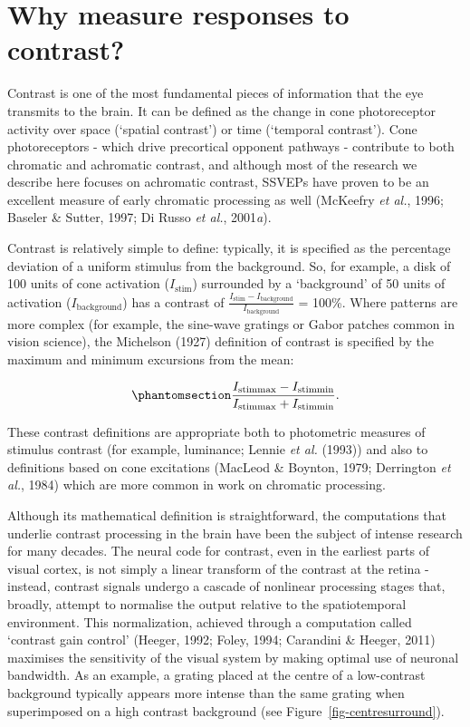 \documentclass[
  letterpaper,
  DIV=11,
  numbers=noendperiod]{scrartcl}
\begin{document}
\section{Why measure responses to
contrast?}\label{why-measure-responses-to-contrast}

Contrast is one of the most fundamental pieces of information that the
eye transmits to the brain. It can be defined as the change in cone
photoreceptor activity over space (`spatial contrast') or time
(`temporal contrast'). Cone photoreceptors - which drive precortical
opponent pathways - contribute to both chromatic and achromatic
contrast, and although most of the research we describe here focuses on
achromatic contrast, SSVEPs have proven to be an excellent measure of
early chromatic processing as well (McKeefry \emph{et al.}, 1996;
Baseler \& Sutter, 1997; Di Russo \emph{et al.}, 2001\emph{a}).

Contrast is relatively simple to define: typically, it is specified as
the percentage deviation of a uniform stimulus from the background. So,
for example, a disk of 100 units of cone activation
(\(I_{\mathrm{stim}}\)) surrounded by a `background' of 50 units of
activation (\(I_{\mathrm{background}}\)) has a contrast of
\(\frac{I_{\mathrm{stim}} - I_{\mathrm{background}}}{I_{\mathrm{background}}}\)
= 100\%. Where patterns are more complex (for example, the sine-wave
gratings or Gabor patches common in vision science), the Michelson
(1927) definition of contrast is specified by the maximum and minimum
excursions from the mean:

\begin{equation}\phantomsection\label{eq-michelson}{\frac {I_{\mathrm{stimmax} }-I_{\mathrm{stimmin} }}{I_{\mathrm{stimmax} }+I_{\mathrm{stimmin} }}.}\end{equation}

These contrast definitions are appropriate both to photometric measures
of stimulus contrast (for example, luminance; Lennie \emph{et al.}
(1993)) and also to definitions based on cone excitations (MacLeod \&
Boynton, 1979; Derrington \emph{et al.}, 1984) which are more common in
work on chromatic processing.

Although its mathematical definition is straightforward, the
computations that underlie contrast processing in the brain have been
the subject of intense research for many decades. The neural code for
contrast, even in the earliest parts of visual cortex, is not simply a
linear transform of the contrast at the retina - instead, contrast
signals undergo a cascade of nonlinear processing stages that, broadly,
attempt to normalise the output relative to the spatiotemporal
environment. This normalization, achieved through a computation called
`contrast gain control' (Heeger, 1992; Foley, 1994; Carandini \& Heeger,
2011) maximises the sensitivity of the visual system by making optimal
use of neuronal bandwidth. As an example, a grating placed at the centre
of a low-contrast background typically appears more intense than the
same grating when superimposed on a high contrast background (see
Figure~\ref{fig-centresurround}).
\end{document}
